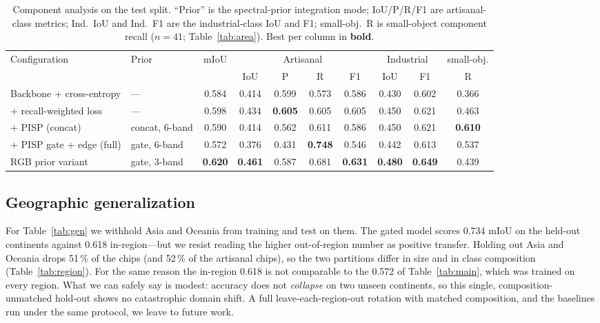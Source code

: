 \documentclass[review]{elsarticle}
\newcommand{\best}[1]{\textbf{#1}}
\begin{document}
\begin{table}[t]
\centering
\caption{Component analysis on the test split. ``Prior'' is the spectral-prior integration
mode; IoU/P/R/F1 are artisanal-class metrics; Ind.\ IoU and Ind.\ F1 are the industrial-class
IoU and F1; small-obj.\ R is small-object component recall ($n=41$; Table~\ref{tab:area}).
Best per column in \textbf{bold}.}
\label{tab:ablation}
\footnotesize
\setlength{\tabcolsep}{3.5pt}
\begin{adjustbox}{max width=\linewidth}
\begin{tabular}{l l c cccc cc c}
\toprule
Configuration & Prior & mIoU & \multicolumn{4}{c}{Artisanal} & \multicolumn{2}{c}{Industrial} & small-obj.\\
\cmidrule(lr){4-7}\cmidrule(lr){8-9}
 & & & IoU & P & R & F1 & IoU & F1 & R\\
\midrule
Backbone + cross-entropy    & ---            & 0.584 & 0.414 & 0.599 & 0.573 & 0.586 & 0.430 & 0.602 & 0.366 \\
\;+ recall-weighted loss    & ---            & 0.598 & 0.434 & \best{0.605} & 0.605 & 0.605 & 0.450 & 0.621 & 0.463 \\
\;+ PISP (concat)           & concat, 6-band & 0.590 & 0.414 & 0.562 & 0.611 & 0.586 & 0.450 & 0.621 & \best{0.610} \\
\;+ PISP gate + edge (full) & gate, 6-band   & 0.572 & 0.376 & 0.431 & \best{0.748} & 0.546 & 0.442 & 0.613 & 0.537 \\
\;\;\;RGB prior variant     & gate, 3-band   & \best{0.620} & \best{0.461} & 0.587 & 0.681 & \best{0.631} & \best{0.480} & \best{0.649} & 0.439 \\
\bottomrule
\end{tabular}
\end{adjustbox}
\end{table}

\subsection{Geographic generalization}\label{sec:results-gen}
For Table~\ref{tab:gen} we withhold Asia and Oceania from training and test on them. The
gated model scores \num{0.734} mIoU on the held-out continents against \num{0.618}
in-region---but we resist reading the higher out-of-region number as positive transfer.
Holding out Asia and Oceania drops \num{51}\,\% of the chips (and \num{52}\,\% of the
artisanal chips), so the two partitions differ in size and in class composition
(Table~\ref{tab:region}). For the same reason the in-region \num{0.618} is not comparable to
the \num{0.572} of Table~\ref{tab:main}, which was trained on every region. What we can
safely say is modest: accuracy does not \emph{collapse} on two unseen continents, so this
single, composition-unmatched hold-out shows no catastrophic domain shift. A full
leave-each-region-out rotation with matched composition, and the baselines run under the same
protocol, we leave to future work.
\end{document}
